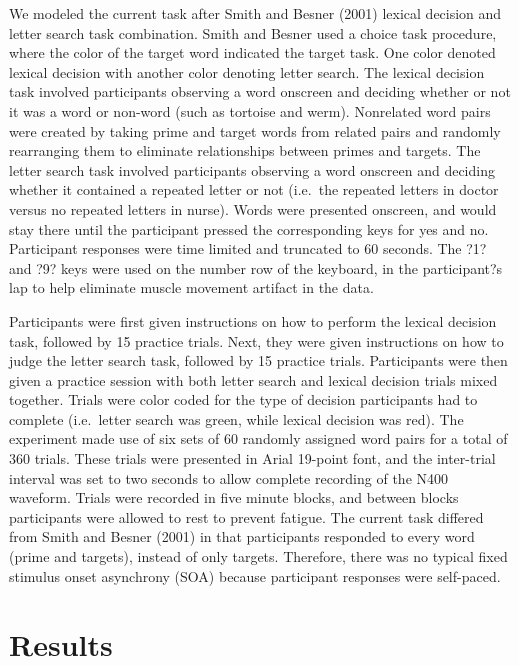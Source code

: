 \documentclass[english,man]{apa6}
\theoremstyle{definition}
\theoremstyle{definition}
\theoremstyle{remark}
\begin{document}
We modeled the current task after Smith and Besner (2001) lexical
decision and letter search task combination. Smith and Besner used a
choice task procedure, where the color of the target word indicated the
target task. One color denoted lexical decision with another color
denoting letter search. The lexical decision task involved participants
observing a word onscreen and deciding whether or not it was a word or
non-word (such as tortoise and werm). Nonrelated word pairs were created
by taking prime and target words from related pairs and randomly
rearranging them to eliminate relationships between primes and targets.
The letter search task involved participants observing a word onscreen
and deciding whether it contained a repeated letter or not (i.e.~the
repeated letters in doctor versus no repeated letters in nurse). Words
were presented onscreen, and would stay there until the participant
pressed the corresponding keys for yes and no. Participant responses
were time limited and truncated to 60 seconds. The ?1? and ?9? keys were
used on the number row of the keyboard, in the participant?s lap to help
eliminate muscle movement artifact in the data.

Participants were first given instructions on how to perform the lexical
decision task, followed by 15 practice trials. Next, they were given
instructions on how to judge the letter search task, followed by 15
practice trials. Participants were then given a practice session with
both letter search and lexical decision trials mixed together. Trials
were color coded for the type of decision participants had to complete
(i.e.~letter search was green, while lexical decision was red). The
experiment made use of six sets of 60 randomly assigned word pairs for a
total of 360 trials. These trials were presented in Arial 19-point font,
and the inter-trial interval was set to two seconds to allow complete
recording of the N400 waveform. Trials were recorded in five minute
blocks, and between blocks participants were allowed to rest to prevent
fatigue. The current task differed from Smith and Besner (2001) in that
participants responded to every word (prime and targets), instead of
only targets. Therefore, there was no typical fixed stimulus onset
asynchrony (SOA) because participant responses were self-paced.

\section{Results}\label{results}
\end{document}
